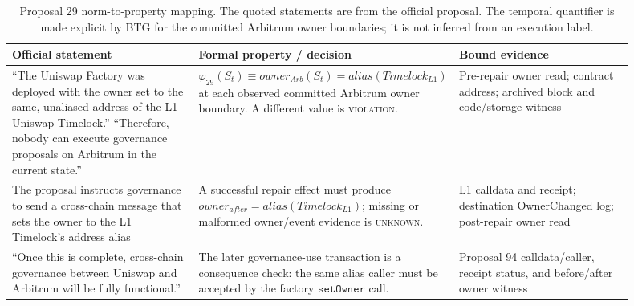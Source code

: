 \begin{table}[t]\centering\scriptsize
\caption{Proposal 29 norm-to-property mapping. The quoted statements are from the official proposal. The temporal quantifier is made explicit by BTG for the committed Arbitrum owner boundaries; it is not inferred from an execution label.}
\label{tab:proposal29-norm-mapping}
\begin{tabular}{@{}p{0.30\linewidth}p{0.32\linewidth}p{0.28\linewidth}@{}}\toprule
Official statement & Formal property / decision & Bound evidence \\ \midrule
``The Uniswap Factory was deployed with the owner set to the same, unaliased address of the L1 Uniswap Timelock.'' ``Therefore, nobody can execute governance proposals on Arbitrum in the current state.''~\cite{uniswapproposal29} & 
$\varphi_{29}(S_t)\equiv owner_{Arb}(S_t)=alias(Timelock_{L1})$ at each observed committed Arbitrum owner boundary. A different value is \textsc{violation}. & 
Pre-repair owner read; contract address; archived block and code/storage witness \\
The proposal instructs governance to send a cross-chain message that sets the owner to the L1 Timelock's address alias~\cite{uniswapproposal29} & 
A successful repair effect must produce $owner_{after}=alias(Timelock_{L1})$; missing or malformed owner/event evidence is \textsc{unknown}. & 
L1 calldata and receipt; destination OwnerChanged log; post-repair owner read \\
``Once this is complete, cross-chain governance between Uniswap and Arbitrum will be fully functional.''~\cite{uniswapproposal29} & 
The later governance-use transaction is a consequence check: the same alias caller must be accepted by the factory $\texttt{setOwner}$ call. & 
Proposal 94 calldata/caller, receipt status, and before/after owner witness \\
\bottomrule
\end{tabular}
\end{table}
